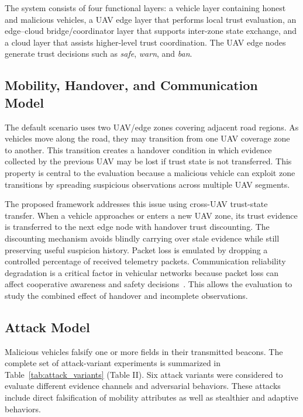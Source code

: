 \documentclass[journal]{IEEEtran}
\begin{document}
The system consists of four functional layers: a vehicle layer containing honest and malicious vehicles, a UAV edge layer that performs local trust evaluation, an edge--cloud bridge/coordinator layer that supports inter-zone state exchange, and a cloud layer that assists higher-level trust coordination. The UAV edge nodes generate trust decisions such as \textit{safe}, \textit{warn}, and \textit{ban}.

\subsection{Mobility, Handover, and Communication Model}
\label{subsec:mobility_handover_model}

The default scenario uses two UAV/edge zones covering adjacent road regions. As vehicles move along the road, they may transition from one UAV coverage zone to another. This transition creates a handover condition in which evidence collected by the previous UAV may be lost if trust state is not transferred. This property is central to the evaluation because a malicious vehicle can exploit zone transitions by spreading suspicious observations across multiple UAV segments.

The proposed framework addresses this issue using cross-UAV trust-state transfer. When a vehicle approaches or enters a new UAV zone, its trust evidence is transferred to the next edge node with handover trust discounting. The discounting mechanism avoids blindly carrying over stale evidence while still preserving useful suspicion history. Packet loss is emulated by dropping a controlled percentage of received telemetry packets. Communication reliability degradation is a critical factor in vehicular networks because packet loss can affect cooperative awareness and safety decisions~\cite{karagiannis2011vehicular}. This allows the evaluation to study the combined effect of handover and incomplete observations.

\subsection{Attack Model}
\label{subsec:attack_model}

Malicious vehicles falsify one or more fields in their transmitted beacons.
The complete set of attack-variant experiments is summarized in
Table~\ref{tab:attack_variants} (Table II). Six attack variants were considered
to evaluate different evidence channels and adversarial behaviors. These
attacks include direct falsification of mobility attributes as well as
stealthier and adaptive behaviors.
\end{document}
